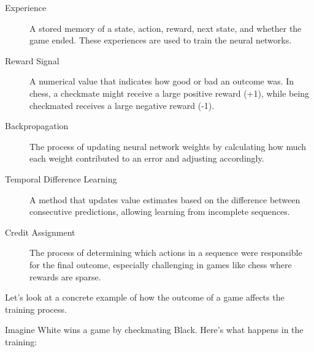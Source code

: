 \documentclass[11pt]{article}
\newenvironment{termbox}[1]
  {\begin{tcolorbox}[colback=blue!5!white,colframe=blue!75!black,title=#1,fonttitle=\bfseries]}
  {\end{tcolorbox}}
\begin{document}
\begin{termbox}{Key Technical Terms in Reinforcement Learning Process}
\begin{description}
    \item[Experience] A stored memory of a state, action, reward, next state, and whether the game ended. These experiences are used to train the neural networks.
    
    \item[Reward Signal] A numerical value that indicates how good or bad an outcome was. In chess, a checkmate might receive a large positive reward (+1), while being checkmated receives a large negative reward (-1).
    
    \item[Backpropagation] The process of updating neural network weights by calculating how much each weight contributed to an error and adjusting accordingly.
    
    \item[Temporal Difference Learning] A method that updates value estimates based on the difference between consecutive predictions, allowing learning from incomplete sequences.
    
    \item[Credit Assignment] The process of determining which actions in a sequence were responsible for the final outcome, especially challenging in games like chess where rewards are sparse.
\end{description}
\end{termbox}

Let's look at a concrete example of how the outcome of a game affects the training process.

Imagine White wins a game by checkmating Black. Here's what happens in the training:
\end{document}
